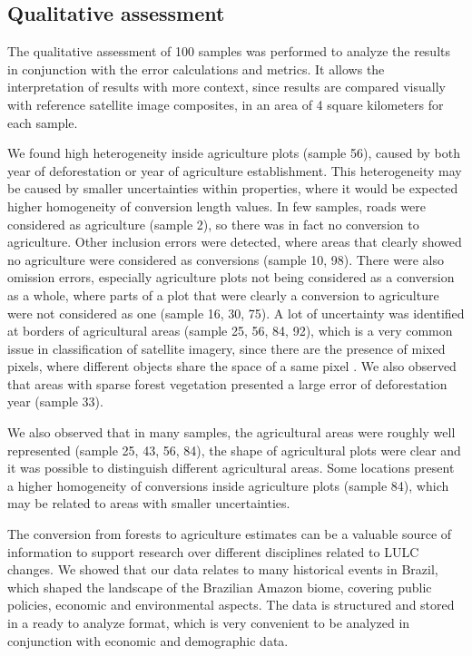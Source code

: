 \documentclass[essd, manuscript]{copernicus}
\begin{document}
\subsection{Qualitative assessment}

The qualitative assessment of 100 samples was performed to analyze the results in conjunction with the error calculations and metrics.
It allows the interpretation of results with more context, since results are compared visually with reference satellite image composites, in an area of 4 square kilometers for each sample.

We found high heterogeneity inside agriculture plots (sample 56), caused by both year of deforestation or year of agriculture establishment.
This heterogeneity may be caused by smaller uncertainties within properties, where it would be expected higher homogeneity of conversion length values.
In few samples, roads were considered as agriculture (sample 2), so there was in fact no conversion to agriculture.
Other inclusion errors were detected, where areas that clearly showed no agriculture were considered as conversions (sample 10, 98).
There were also omission errors, especially agriculture plots not being considered as a conversion as a whole, where parts of a plot that were clearly a conversion to agriculture were not considered as one (sample 16, 30, 75).
A lot of uncertainty was identified at borders of agricultural areas (sample 25, 56, 84, 92), which is a very common issue in classification of satellite imagery, since there are the presence of mixed pixels, where different objects share the space of a same pixel \citep{Kaur2019}.
We also observed that areas with sparse forest vegetation presented a large error of deforestation year (sample 33).

We also observed that in many samples, the agricultural areas were roughly well represented (sample 25, 43, 56, 84), the shape of agricultural plots were clear and it was possible to distinguish different agricultural areas.
Some locations present a higher homogeneity of conversions inside agriculture plots (sample 84), which may be related to areas with smaller uncertainties.

\conclusions[Conclusions]

The conversion from forests to agriculture estimates can be a valuable source of information to support research over different disciplines related to LULC changes.
We showed that our data relates to many historical events in Brazil, which shaped the landscape of the Brazilian Amazon biome, covering public policies, economic and environmental aspects.
The data is structured and stored in a ready to analyze format, which is very convenient to be analyzed in conjunction with economic and demographic data.
\end{document}
